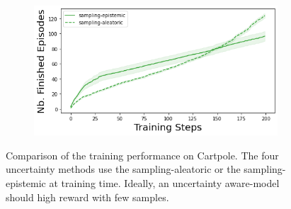 \begin{figure}
\begin{subfigure}{.245\textwidth}
    \end{subfigure}
    \begin{subfigure}{.245\textwidth}
        \includegraphics[width=\textwidth]{sections/011_icml2022/resources/cartpole-n_finished_training_episodes-postnet-training-strategy.png}
    \end{subfigure}
    \caption{Comparison of the training performance on Cartpole. The four uncertainty methods use the sampling-aleatoric or the sampling-epistemic at training time. Ideally, an uncertainty aware-model should high reward with few samples.}
    \label{fig:strategy-training-performance-cartpole}
\end{figure}